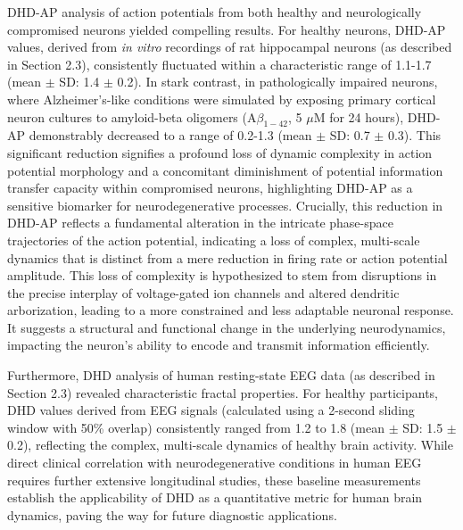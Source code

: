 \documentclass{article}
\begin{document}
DHD-AP analysis of action potentials from both healthy and neurologically compromised neurons yielded compelling results. For healthy neurons, DHD-AP values, derived from \textit{in vitro} recordings of rat hippocampal neurons (as described in Section 2.3), consistently fluctuated within a characteristic range of 1.1-1.7 (mean $\pm$ SD: 1.4 $\pm$ 0.2). In stark contrast, in pathologically impaired neurons, where Alzheimer’s-like conditions were simulated by exposing primary cortical neuron cultures to amyloid-beta oligomers (A$\beta_{1-42}$, 5 $\mu$M for 24 hours), DHD-AP demonstrably decreased to a range of 0.2-1.3 (mean $\pm$ SD: 0.7 $\pm$ 0.3). This significant reduction signifies a profound loss of dynamic complexity in action potential morphology and a concomitant diminishment of potential information transfer capacity within compromised neurons, highlighting DHD-AP as a sensitive biomarker for neurodegenerative processes. Crucially, this reduction in DHD-AP reflects a fundamental alteration in the intricate phase-space trajectories of the action potential, indicating a loss of complex, multi-scale dynamics that is distinct from a mere reduction in firing rate or action potential amplitude. This loss of complexity is hypothesized to stem from disruptions in the precise interplay of voltage-gated ion channels and altered dendritic arborization, leading to a more constrained and less adaptable neuronal response. It suggests a structural and functional change in the underlying neurodynamics, impacting the neuron's ability to encode and transmit information efficiently.

Furthermore, DHD analysis of human resting-state EEG data (as described in Section 2.3) revealed characteristic fractal properties. For healthy participants, DHD values derived from EEG signals (calculated using a 2-second sliding window with 50\% overlap) consistently ranged from 1.2 to 1.8 (mean $\pm$ SD: 1.5 $\pm$ 0.2), reflecting the complex, multi-scale dynamics of healthy brain activity. While direct clinical correlation with neurodegenerative conditions in human EEG requires further extensive longitudinal studies, these baseline measurements establish the applicability of DHD as a quantitative metric for human brain dynamics, paving the way for future diagnostic applications.
\end{document}
